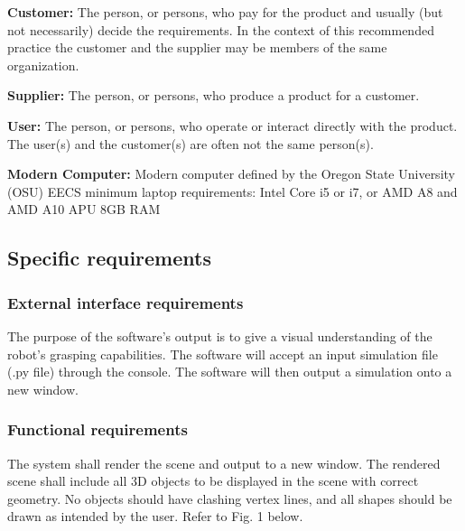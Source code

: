 \begin{flushleft}
\vspace{3mm}
\textbf{Customer:}
The person, or persons, who pay for the product and usually (but not necessarily) decide the requirements. In the context of this recommended practice the customer and the supplier may be members of the same organization.

\vspace{3mm}
\textbf{Supplier:}
The person, or persons, who produce a product for a customer.

\vspace{3mm}
\textbf{User:}
The person, or persons, who operate or interact directly with the product. The user(s) and the customer(s) are often not the same person(s).

\vspace{3mm}
\textbf{Modern Computer:}
Modern computer defined by the Oregon State University (OSU) EECS minimum laptop requirements: 
Intel Core i5 or i7, or AMD A8 and AMD A10 APU 8GB RAM

\newpage

\subsection{Specific requirements}
\vspace{3mm}

\subsubsection{External interface requirements}
\vspace{3mm}
The purpose of the software's output is to give a visual understanding of the robot's grasping capabilities.
The software will accept an input simulation file (.py file) through the console.
The software will then output a simulation onto a new window.

\subsubsection{Functional requirements}
\vspace{3mm}
The system shall render the scene and output to a new window.
The rendered scene shall include all 3D objects to be displayed in the scene with correct geometry.
No objects should have clashing vertex lines, and all shapes should be drawn as intended by the user.
Refer to Fig. 1 below.


\end{flushleft}
